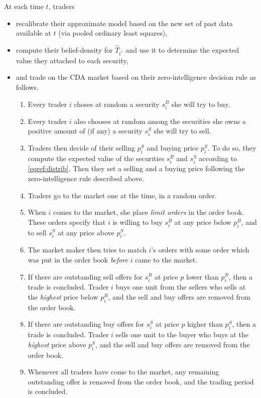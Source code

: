 \documentclass[10pt,a4paper]{article}
\begin{document}
 	    At each time $t$, traders
 	\begin{itemize}
 		\setlength\itemsep{0em}
 		\item recalibrate their approximate model based on the new set of past data available at $t$ (via pooled ordinary least squares),
 		\item compute their belief-density for $\hat{T}_{t^*}$ and use it to determine the expected value they attached to each security,
 		\item and trade on the CDA market based on their zero-intelligence decision rule as follows. 
 		\begin{enumerate}
 			\setlength\itemsep{0em}
 			\item Every trader $i$ choses at random a security $s_i^B$ she will try to buy.
 			\item Every trader $i$ also chooses at random among the securities she owns a positive amount of (if any) a security $s_i^S$ she will try to sell.
 			\item Traders then decide of their selling $p_i^S$ and buying price $p_i^S$. To do so, they compute the expected value of the securities $s_i^B$ and $s_i^S$ according to \eqref{eqref:distrib}. Then they set a selling and a buying price following the zero-intelligence rule described above.
 			\item Traders go to the market one at the time, in a random order.
 			\item When $i$ comes to the market, she place \emph{limit orders} in the order book. These orders  specify that $i$ is willing to buy $s_i^B$ at  any price below $p_i^B$, and to sell $s_i^S$ at any price above $p_i^S$.
 			\item The market maker then tries to match $i$'s orders with some order which was put in the order book \emph{before} $i$ came to the market.
 			\item If there are  outstanding sell offers for $s_i^B$ at price $p$ lower than $p_i^B$, then a trade is concluded. Trader $i$ buys one unit from the sellers who sells at the \emph{highest} price below $p_i^B$, and the sell and buy offers are removed from the order book.
 			\item If there are  outstanding buy offers for $s_i^S$ at price $p$ higher than $p_i^S$, then a trade is concluded. Trader $i$ sells one unit to the buyer who buys at the \emph{highest} price above $p_i^S$, and the  sell and buy offers are removed from the order book.
 			\item Whenever all traders have come to the market, any remaining outstanding offer is removed from the order book, and the trading period is concluded. 
 		\end{enumerate} 
 	\end{itemize}
 	
\end{document}
